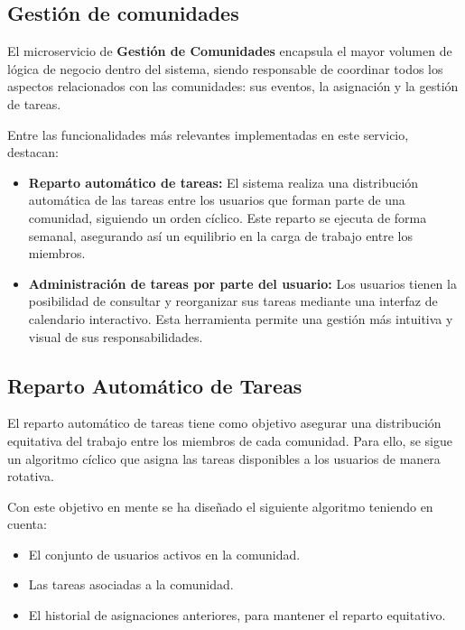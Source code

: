 \newpage


\subsection{Gestión de comunidades}
El microservicio de \textbf{Gestión de Comunidades} encapsula el mayor volumen de lógica de negocio dentro del sistema, siendo responsable de coordinar todos los aspectos relacionados con las comunidades: sus eventos, la asignación y la gestión de tareas.

Entre las funcionalidades más relevantes implementadas en este servicio, destacan:

\begin{itemize}
  \item \textbf{Reparto automático de tareas:}  
  El sistema realiza una distribución automática de las tareas entre los usuarios que forman parte de una comunidad, siguiendo un orden cíclico. Este reparto se ejecuta de forma semanal, asegurando así un equilibrio en la carga de trabajo entre los miembros.

  \item \textbf{Administración de tareas por parte del usuario:}  
  Los usuarios tienen la posibilidad de consultar y reorganizar sus tareas mediante una interfaz de calendario interactivo. Esta herramienta permite una gestión más intuitiva y visual de sus responsabilidades.
\end{itemize}

\subsection*{Reparto Automático de Tareas}

El reparto automático de tareas tiene como objetivo asegurar una distribución equitativa del trabajo entre los miembros de cada comunidad. Para ello, se sigue un algoritmo cíclico que asigna las tareas disponibles a los usuarios de manera rotativa.

Con este objetivo en mente se ha diseñado el siguiente algoritmo teniendo en cuenta:
\begin{itemize}
  \item El conjunto de usuarios activos en la comunidad.
  \item Las tareas asociadas a la comunidad.
  \item El historial de asignaciones anteriores, para mantener el reparto equitativo.
\end{itemize}

